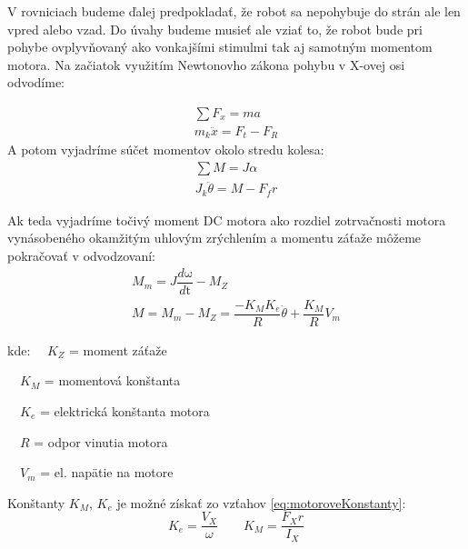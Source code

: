 V rovniciach budeme ďalej predpokladať, že robot sa nepohybuje do strán ale len vpred alebo vzad. Do úvahy budeme musieť ale vziať to, že robot bude pri pohybe ovplyvňovaný ako vonkajšími stimulmi tak aj samotným momentom motora. Na začiatok využitím Newtonovho zákona pohybu v X-ovej osi odvodíme:

\begin{equation}
\begin{gathered}
\sum{F_x} = ma \\
m_k \ddot{x} = F_t - F_R
\end{gathered}
\label{eq:forceOnWheeles}
\end{equation}
A potom vyjadríme súčet momentov okolo stredu kolesa:
\begin{equation}
\begin{gathered}
\sum{M} = J \alpha \\
J_k\ddot{\theta} = M - F_f r
\end{gathered}
\label{eq:zotrvacnost}
\end{equation}

Ak teda vyjadríme točivý moment DC motora ako rozdiel zotrvačnosti motora vynásobeného okamžitým uhlovým zrýchlením a momentu záťaže môžeme pokračovať v odvodzovaní:
\begin{equation}
\begin{gathered}
M_m = J \dfrac{d \mathrm{\omega}}{d \mathrm{t}} - M_Z
\\
M = M_m - M_Z = \dfrac{-K_M K_e}{R} \dot{\theta}+ \dfrac{K_M}{R} V_m
\end{gathered}
\label{eq:moment}
\end{equation}

kde:
$\quad K_Z$ = moment záťaže

$\quad K_M$ = momentová konštanta

$\quad K_e$ = elektrická konštanta motora

$\quad R$ = odpor vinutia motora

$\quad V_m$ = el. napätie na motore

Konštanty $K_M$, $K_e$ je možné získať zo vzťahov \eqref{eq:motoroveKonstanty}:
\begin{equation}
K_e = \dfrac{V_X}{\omega} \quad \quad K_M = \dfrac{F_X r}{I_X}
\label{eq:motoroveKonstanty}
\end{equation}


